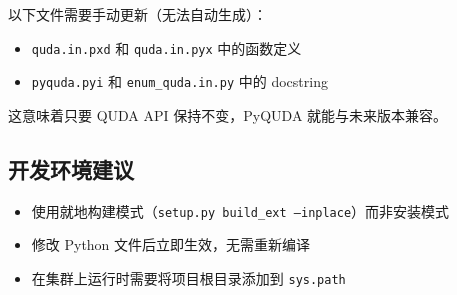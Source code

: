 \documentclass[12pt,a4paper]{ctexart}
\begin{document}
以下文件需要手动更新（无法自动生成）：
\begin{itemize}[itemsep=2pt]
    \item \texttt{quda.in.pxd} 和 \texttt{quda.in.pyx} 中的函数定义
    \item \texttt{pyquda.pyi} 和 \texttt{enum\_quda.in.py} 中的 docstring
\end{itemize}

这意味着只要 QUDA API 保持不变，PyQUDA 就能与未来版本兼容。

\subsection{开发环境建议}

\begin{itemize}[itemsep=2pt]
    \item 使用就地构建模式（\texttt{setup.py build\_ext --inplace}）而非安装模式
    \item 修改 Python 文件后立即生效，无需重新编译
    \item 在集群上运行时需要将项目根目录添加到 \texttt{sys.path}
\end{itemize}
\end{document}
